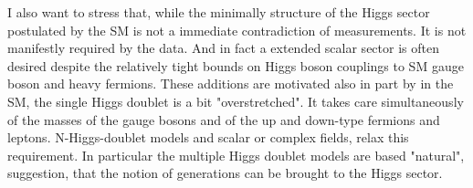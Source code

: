 I also want to stress that, while the minimally structure of the Higgs sector postulated by the SM is not a immediate contradiction of measurements. It is not manifestly required by the data. And in fact a extended scalar sector is often desired despite the relatively tight bounds on Higgs boson couplings to SM gauge boson and heavy fermions. 
%
These additions are motivated also in part by in the  SM,  the  single Higgs  doublet is  a bit "overstretched".  It  takes  care  simultaneously  of  the masses of the gauge bosons and of the up and down-type fermions and leptons. N-Higgs-doublet models and scalar or complex fields,  relax  this  requirement.   
%
In particular the multiple Higgs doublet models are based "natural",  suggestion,  that the  notion  of  generations  can  be  brought  to  the  Higgs  sector. 





